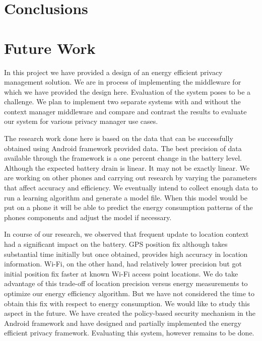\documentclass{ubicomp2013}
\begin{document}
\section{Conclusions}

\section{Future Work}

In this project we have provided a design of an energy efficient privacy management solution. We are in process of implementing the middleware for which we have provided the design here. Evaluation of the system poses to be a challenge. We plan to implement two separate systems with and without the context manager middleware and compare and contrast the results to evaluate our system for various privacy manager use cases.

The research work done here is based on the data that can be successfully obtained using Android framework provided data. The best precision of data available through the framework is a one percent change in the battery level. Although the expected battery drain is linear. It may not be exactly linear. We are working on other phones and carrying out research by varying the parameters that affect accuracy and efficiency. We eventually intend to collect enough data to run a learning algorithm and generate a model file. When this model would be put on a phone it will be able to predict the energy consumption patterns of the phones components and adjust the model if necessary.

In course of our research, we observed that frequent update to location context had a significant impact on the battery. GPS position fix although takes substantial time initially \cite{liu2012gps} but once obtained, provides high accuracy in location information. Wi-Fi, on the other hand, had relatively lower precision but got initial position fix faster at known Wi-Fi access point locations. We do take advantage of this trade-off of location precision versus energy measurements to optimize our energy efficiency algorithm. But we have not considered the time to obtain this fix with respect to energy consumption. We would like to study this aspect in the future. We have created the policy-based security mechanism in the Android framework \cite{ghosh2012ms, ghosh2012privacy} and have designed and partially implemented the energy efficient privacy framework. Evaluating this system, however remains to be done.




\end{document}
